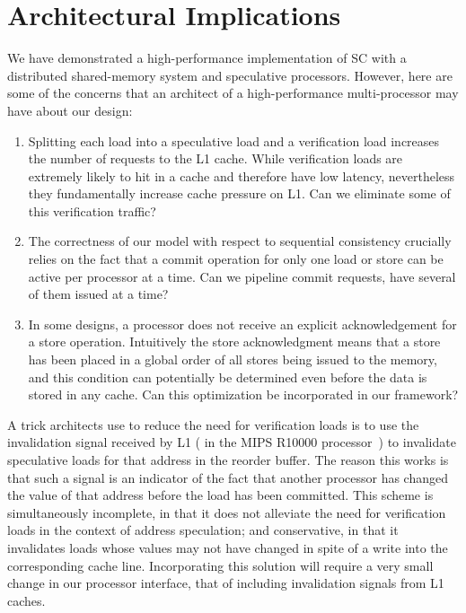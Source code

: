 \section{Architectural Implications}\label{sec:implications}

We have demonstrated a high-performance implementation of SC with
a distributed shared-memory system and speculative processors. However, here
are some of the concerns that an architect of a high-performance multi-processor
may have about our design:

\begin{enumerate}
\item Splitting each load into a speculative load and a verification
load increases the number of requests to the L1 cache. While verification loads
are extremely likely to hit in a cache and therefore have low latency,
nevertheless they fundamentally increase cache pressure on L1. Can we
eliminate some of this verification traffic?

\item The correctness of our model with respect to sequential consistency
crucially relies on the fact that a commit operation for only one load or store
can be active per processor at a time. Can we pipeline commit requests, \ie{}
have several of them issued at a time?

\item In some designs, a processor does not receive an explicit acknowledgement
for a store operation. Intuitively the store acknowledgment means that a store
has been placed in a global order of all stores being issued to the memory, and
this condition can potentially be determined even before the data is stored in
any cache. Can this optimization be incorporated in our framework?
\end{enumerate}

A trick architects use to reduce the need for verification loads is to use the
invalidation signal received by L1 (\eg{} in the MIPS R10000 processor~\cite{yeager1996mips}) 
to invalidate speculative loads for that address in the reorder buffer. 
The reason this works is that such a signal is an
indicator of the fact that another processor has changed the value of that
address before the load has been committed. This scheme is simultaneously
incomplete, in that it does not alleviate the need for verification loads in the
context of address speculation; and conservative, in that it invalidates loads
whose values may not have changed in spite of a write into the corresponding
cache line. Incorporating this solution will require a very small change in our
processor interface, \viz{} that of including invalidation signals from L1
caches.

